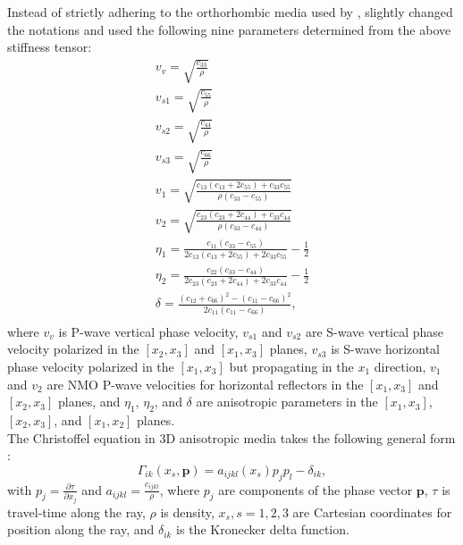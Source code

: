 Instead of strictly adhering to the orthorhombic media used by \cite{tsvank,tsvan}, \cite{alkaor} slightly changed the notations and used the following nine parameters determined from the above stiffness tensor:
\begin{equation}
  \label{eq:p9}
   \begin{array}{l}
           v_v=\sqrt{\frac{c_{33}}{\rho}} \\ 
           v_{s1}=\sqrt{\frac{c_{55}}{\rho}} \\ 
           v_{s2}=\sqrt{\frac{c_{44}}{\rho}} \\
           v_{s3}=\sqrt{\frac{c_{66}}{\rho}} \\ 
           \displaystyle v_{1}=\sqrt{\frac{c_{13}(c_{13}+2c_{55})+c_{33}c_{55}}{\rho(c_{33}-c_{55})}} \\ 
           \displaystyle v_{2}=\sqrt{\frac{c_{23}(c_{23}+2c_{44})+c_{33}c_{44}}{\rho(c_{33}-c_{44})}}\\
           \displaystyle \eta_1=\frac{c_{11}(c_{33}-c_{55})}{2c_{13}(c_{13}+2c_{55})+2c_{33}c_{55}}-\frac{1}{2} \\ 
           \displaystyle \eta_2=\frac{c_{22}(c_{33}-c_{44})}{2c_{23}(c_{23}+2c_{44})+2c_{33}c_{44}}-\frac{1}{2} \\ 
           \displaystyle \delta=\frac{(c_{12}+c_{66})^2-(c_{11}-c_{66})^2}{2c_{11}(c_{11}-c_{66})}, \\
          \end{array} 
\end{equation}
where $v_v$ is P-wave vertical phase velocity, 
$v_{s1}$ and $v_{s2}$ are S-wave vertical phase velocity 
polarized in the $[x_2,x_3]$ and $[x_1,x_3]$ planes, 
$v_{s3}$ is S-wave horizontal phase velocity 
polarized in the $[x_1,x_3]$ but propagating in the $x_1$ direction, 
$v_1$ and $v_2$ are NMO P-wave velocities 
for horizontal reflectors in the $[x_1,x_3]$ and $[x_2,x_3]$ planes, 
and $\eta_1$, $\eta_2$, and $\delta$ are anisotropic parameters 
in the $[x_1,x_3]$, $[x_2,x_3]$, and $[x_1,x_2]$ planes.\\
 
The Christoffel equation in 3D anisotropic media takes the
following general form \cite[]{chapman}:
\begin{equation}
  \label{eq:chris}
\Gamma_{ik}(x_s,\mathbf{p})=a_{ijkl}(x_s)p_jp_l-\delta_{ik},
\end{equation}
with $p_j=\frac{\partial \tau}{\partial x_j}$ and $a_{ijkl}=\frac{c_{ijkl}}{\rho}$,
where $p_j$ are components of the phase vector $\mathbf{p}$, 
$\tau$ is travel-time along the ray, $\rho$ is density,
$x_s, s=1,2,3$ are Cartesian coordinates for position along the ray,
and $\delta_{ik}$ is the Kronecker delta function. \\

